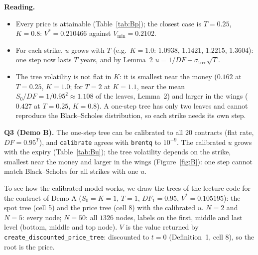 \documentclass[11pt,a4paper]{article}
\newcommand{\ansbox}[1]{\begin{ansboxenv}#1\end{ansboxenv}}
\newcommand{\subhead}[1]{\par\medskip\noindent{\large\bfseries #1}\par\smallskip\noindent\ignorespaces}
\begin{document}
\begin{minipage}{\linewidth}
{}
\label{fig:B}
\end{minipage}

\par\medskip\noindent\textbf{Reading.}
\begin{itemize}
\item Every price is attainable (Table~\ref{tab:Bp}); the closest case is $T=0.25$, $K=0.8$: $V^*=0.210466$ against $V_{\min}=0.2102$.
\item For each strike, $u$ grows with $T$ (e.g.\ $K=1.0$: $1.0938$, $1.1421$, $1.2215$, $1.3604$): one step now lasts $T$ years, and by Lemma~2 $u=1/DF+\sigma_{\text{tree}}\sqrt T$.
\item The tree volatility is not flat in $K$: it is smallest near the money ($0.162$ at $T=0.25$, $K=1.0$; for $T=2$ at $K=1.1$, near the mean $S_0/DF=1/0.95^2\approx1.108$ of the leaves, Lemma~2) and larger in the wings ($0.427$ at $T=0.25$, $K=0.8$). A one-step tree has only two leaves and cannot reproduce the Black--Scholes distribution, so each strike needs its own step.
\end{itemize}

\ansbox{\textbf{Q3 (Demo B).} The one-step tree can be calibrated to all $20$ contracts (flat rate, $DF=0.95^T$), and \texttt{calibrate} agrees with \texttt{brentq} to $10^{-9}$. The calibrated $u$ grows with the expiry (Table~\ref{tab:Bu}); the tree volatility depends on the strike, smallest near the money and larger in the wings (Figure~\ref{fig:B}): one step cannot match Black--Scholes for all strikes with one $u$.}

\subhead{Q4 --- the calibrated trees.}
To see how the calibrated model works, we draw the trees of the lecture code for the contract of Demo A ($S_0=K=1$, $T=1$, $DF_1=0.95$, $V^*=0.105195$): the spot tree (cell 5) and the price tree (cell 8) with the calibrated $u$. $N=2$ and $N=5$: every node; $N=50$: all $1326$ nodes, labels on the first, middle and last level (bottom, middle and top node). $V$ is the value returned by \texttt{create\_discounted\_price\_tree}: discounted to $t=0$ (Definition~1, cell 8), so the root is the price.
\end{document}
